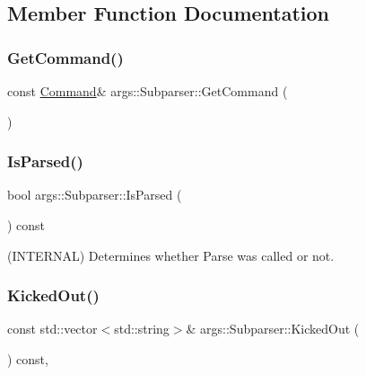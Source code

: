 \subsection{Member Function Documentation}
\mbox{\label{classargs_1_1_subparser_aa905d5a0c53b105a938f620cf5635b5c}} 
\subsubsection{\texorpdfstring{Get\+Command()}{GetCommand()}}
{\footnotesize\ttfamily const \hyperlink{classargs_1_1_command}{Command}\& args\+::\+Subparser\+::\+Get\+Command (\begin{DoxyParamCaption}{ }\end{DoxyParamCaption})\hspace{0.3cm}{\ttfamily [inline]}}

\mbox{\label{classargs_1_1_subparser_ae4c7180aca9908df174e657cafe86ce8}} 
\subsubsection{\texorpdfstring{Is\+Parsed()}{IsParsed()}}
{\footnotesize\ttfamily bool args\+::\+Subparser\+::\+Is\+Parsed (\begin{DoxyParamCaption}{ }\end{DoxyParamCaption}) const\hspace{0.3cm}{\ttfamily [inline]}}

(I\+N\+T\+E\+R\+N\+AL) Determines whether Parse was called or not. \mbox{\label{classargs_1_1_subparser_add2992dcceeb0f2554f8d099a38e1358}} 
\subsubsection{\texorpdfstring{Kicked\+Out()}{KickedOut()}}
{\footnotesize\ttfamily const std\+::vector$<$std\+::string$>$\& args\+::\+Subparser\+::\+Kicked\+Out (\begin{DoxyParamCaption}{ }\end{DoxyParamCaption}) const\hspace{0.3cm}{\ttfamily [inline]}, {\ttfamily [noexcept]}}

